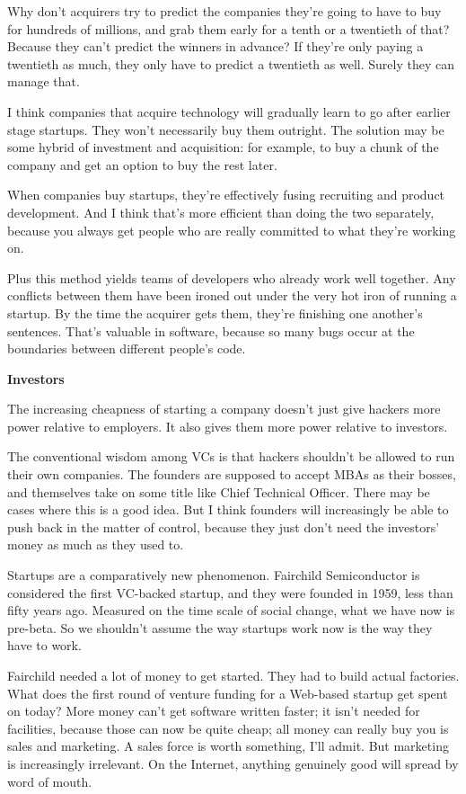 Why don't acquirers try to predict the companies they're going to have
to buy for hundreds of millions, and grab them early for a tenth or a
twentieth of that? Because they can't predict the winners in advance? If
they're only paying a twentieth as much, they only have to predict a
twentieth as well. Surely they can manage that.

I think companies that acquire technology will gradually learn to go
after earlier stage startups. They won't necessarily buy them outright.
The solution may be some hybrid of investment and acquisition: for
example, to buy a chunk of the company and get an option to buy the rest
later.

When companies buy startups, they're effectively fusing recruiting and
product development. And I think that's more efficient than doing the
two separately, because you always get people who are really committed
to what they're working on.

Plus this method yields teams of developers who already work well
together. Any conflicts between them have been ironed out under the very
hot iron of running a startup. By the time the acquirer gets them,
they're finishing one another's sentences. That's valuable in software,
because so many bugs occur at the boundaries between different people's
code.

\textbf{Investors}

The increasing cheapness of starting a company doesn't just give hackers
more power relative to employers. It also gives them more power relative
to investors.

The conventional wisdom among VCs is that hackers shouldn't be allowed
to run their own companies. The founders are supposed to accept MBAs as
their bosses, and themselves take on some title like Chief Technical
Officer. There may be cases where this is a good idea. But I think
founders will increasingly be able to push back in the matter of
control, because they just don't need the investors' money as much as
they used to.

Startups are a comparatively new phenomenon. Fairchild Semiconductor is
considered the first VC-backed startup, and they were founded in 1959,
less than fifty years ago. Measured on the time scale of social change,
what we have now is pre-beta. So we shouldn't assume the way startups
work now is the way they have to work.

Fairchild needed a lot of money to get started. They had to build actual
factories. What does the first round of venture funding for a Web-based
startup get spent on today? More money can't get software written
faster; it isn't needed for facilities, because those can now be quite
cheap; all money can really buy you is sales and marketing. A sales
force is worth something, I'll admit. But marketing is increasingly
irrelevant. On the Internet, anything genuinely good will spread by word
of mouth.

